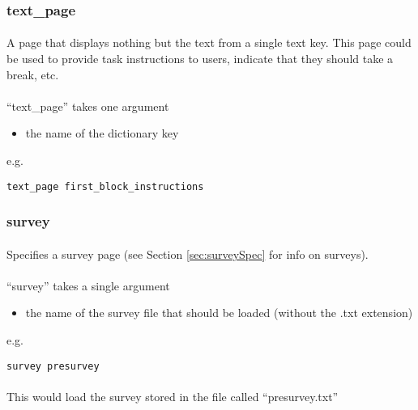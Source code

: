 \subsubsection{text\_page}

\paragraph{}
A page that displays nothing but the text from a single text key.  This page could be used to provide task instructions to users, indicate that they should take a break, etc.

\paragraph{}
``text\_page'' takes one argument
\begin{itemize}
\item the name of the dictionary key
\end{itemize}
e.g.

\begin{lstlisting}
text_page first_block_instructions
\end{lstlisting}


\subsubsection{survey}

\paragraph{}
Specifies a survey page (see Section \ref{sec:surveySpec} for info on surveys).

\paragraph{}
``survey'' takes a single argument
\begin{itemize}
\item the name of the survey file that should be loaded (without the .txt extension)
\end{itemize}

e.g.

\begin{lstlisting}
survey presurvey
\end{lstlisting}

\paragraph{}
This would load the survey stored in the file called ``presurvey.txt''


